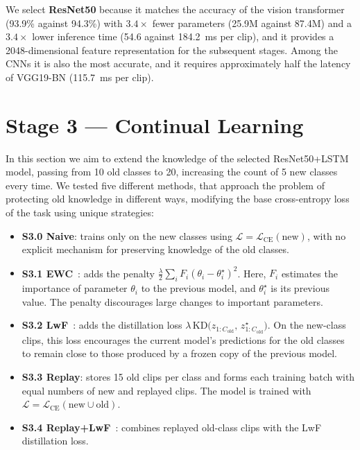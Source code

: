 \documentclass[conference]{IEEEtran}
\begin{document}
We select \textbf{ResNet50} because it matches the accuracy of the vision transformer (93.9\% against
94.3\%) with $3.4\times$ fewer parameters (25.9M against 87.4M) and a $3.4\times$ lower inference time
(54.6 against 184.2~ms per clip), and it provides a 2048-dimensional feature representation for the
subsequent stages. Among the CNNs it is also the most accurate, and it requires approximately half the
latency of VGG19-BN (115.7~ms per clip).

\section{Stage 3 --- Continual Learning}
\label{sec:cl}
In this section we aim to extend the knowledge of the selected ResNet50+LSTM model, passing from 10 old classes to 20, increasing the count of 5 new classes every time.
We tested five different methods, that approach the problem of protecting old knowledge in different ways, modifying the base cross-entropy loss of the task using unique strategies:
\begin{itemize}
\item \textbf{S3.0 Naive}: trains only on the new classes using
$\mathcal{L}=\mathcal{L}_{\text{CE}}(\text{new})$, with no explicit mechanism for
preserving knowledge of the old classes.
\item \textbf{S3.1 EWC}~\cite{kirkpatrick2017ewc}: adds the penalty
$\tfrac{\lambda}{2}\sum_i F_i(\theta_i-\theta_i^{\star})^2$. Here, $F_i$ estimates the
importance of parameter $\theta_i$ to the previous model, and $\theta_i^{\star}$ is its
previous value. The penalty discourages large changes to important parameters.
\item \textbf{S3.2 LwF}~\cite{li2017lwf}: adds the distillation loss
$\lambda\,\mathrm{KD}\big(z_{1:C_{\text{old}}},\,z^{\star}_{1:C_{\text{old}}}\big)$. On
the new-class clips, this loss encourages the current model's predictions for the old
classes to remain close to those produced by a frozen copy of the previous model.
\item \textbf{S3.3 Replay}: stores 15 old clips per class and forms each training batch
with equal numbers of new and replayed clips. The model is trained with
$\mathcal{L}=\mathcal{L}_{\text{CE}}(\text{new}\cup\text{old})$.
\item \textbf{S3.4 Replay+LwF}~\cite{rebuffi2017icarl}: combines replayed old-class clips
with the LwF distillation loss.
\end{itemize}
\end{document}
